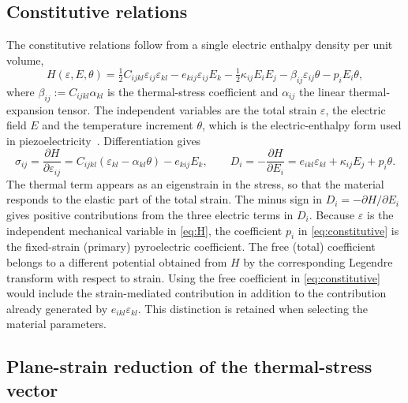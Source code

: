 \documentclass[a4paper,12pt]{elsarticle}
\begin{document}
\subsection{Constitutive relations}

The constitutive relations follow from a single electric enthalpy density per unit
volume,
\begin{equation}
H(\varepsilon,E,\theta)=\tfrac12 C_{ijkl}\varepsilon_{ij}\varepsilon_{kl}
-e_{kij}\varepsilon_{ij}E_k-\tfrac12\kappa_{ij}E_iE_j-\beta_{ij}\varepsilon_{ij}\theta
-p_iE_i\theta,
\label{eq:H}
\end{equation}
where $\beta_{ij}:=C_{ijkl}\alpha_{kl}$ is the thermal-stress coefficient and
$\alpha_{ij}$ the linear thermal-expansion tensor. The independent variables are the
total strain $\varepsilon$, the electric field $E$ and the temperature increment
$\theta$, which is the electric-enthalpy form used in piezoelectricity~\cite{Tiersten1969b,Yang2005b}. Differentiation gives
\begin{equation}
\sigma_{ij}=\frac{\partial H}{\partial\varepsilon_{ij}}
=C_{ijkl}(\varepsilon_{kl}-\alpha_{kl}\theta)-e_{kij}E_k,
\qquad
D_i=-\frac{\partial H}{\partial E_i}
=e_{ikl}\varepsilon_{kl}+\kappa_{ij}E_j+p_i\theta.
\label{eq:constitutive}
\end{equation}
The thermal term appears as an eigenstrain in the stress, so that the material responds
to the elastic part of the total strain. The minus sign in
$D_i=-\partial H/\partial E_i$ gives positive contributions from the three electric
terms in $D_i$. Because $\varepsilon$ is the independent mechanical variable in
\eqref{eq:H}, the coefficient $p_i$ in \eqref{eq:constitutive} is the fixed-strain
(primary) pyroelectric coefficient. The free (total) coefficient belongs to a different
potential obtained from $H$ by the corresponding Legendre transform with respect to
strain. Using the free coefficient in \eqref{eq:constitutive} would include the
strain-mediated contribution in addition to the contribution already generated by
$e_{ikl}\varepsilon_{kl}$. This distinction is retained when selecting the material parameters.

\subsection{Plane-strain reduction of the thermal-stress vector}
\label{sec:planestrain}
\end{document}
